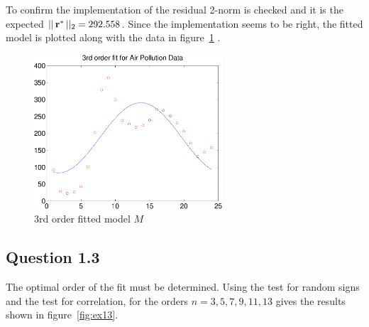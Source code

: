 To confirm the implementation of  the residual 2-norm is checked
and it is the expected $||\,\mathbf{r^*}\,||_2=292.558$. Since the implementation
seems to be right, the fitted model is plotted along with the data in
figure~\ref{fig:3rd-order-fit} .\par

\begin{figure}[ht]
    \centering
    \includegraphics[width=70mm]{../media/3rd-order-fit.pdf}
    \caption{3rd order fitted model $M$}
    \label{fig:3rd-order-fit}
\end{figure}

\subsection*{Question 1.3}


The optimal order of the fit must be determined. Using the test for random
signs and the test for correlation, for the orders $n=3,5,7,9,11,13$ gives the
results shown in figure~\ref{fig:ex13}.

